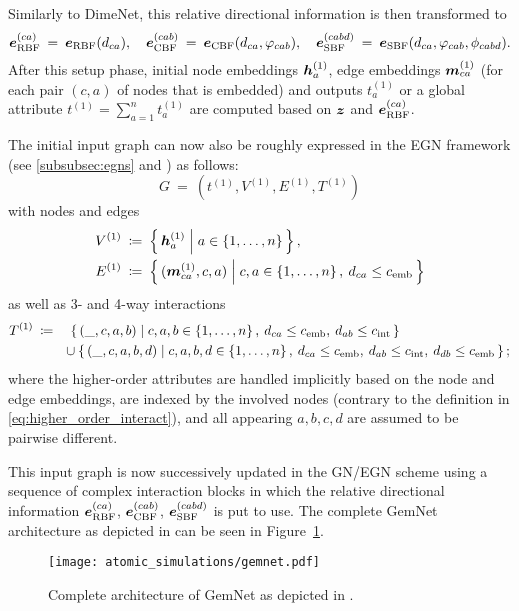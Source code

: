 Similarly to DimeNet, this relative directional information is then transformed to
\[
    \boldsymbol{e}_{\text{RBF}}^{(ca)} \: = \: \boldsymbol{e}_{\text{RBF}}(d_{ca}), 
    \quad \boldsymbol{e}_{\text{CBF}}^{(cab)} \: = \: \boldsymbol{e}_{\text{CBF}}(d_{ca}, \varphi_{cab}),
    \quad \boldsymbol{e}_{\text{SBF}}^{(cabd)} \: = \: \boldsymbol{e}_{\text{SBF}}(d_{ca}, \varphi_{cab}, \phi_{cabd}) 
    \text{.}
\]
After this setup phase, initial node embeddings $\boldsymbol{h}_{a}^{(1)}$, edge embeddings 
$\boldsymbol{m}_{ca}^{(1)}$ (for each pair $(c, a)$ of nodes that is embedded) and outputs
$t_{a}^{(1)}$ or a global attribute $t^{(1)} = \sum_{a=1}^n t_a^{(1)}$
are computed based on $\boldsymbol{z}$ and $\boldsymbol{e}_{\text{RBF}}^{(ca)}$. 

The initial input graph can now also be roughly expressed in the
EGN framework (see \ref{subsubsec:egns} and 
\cite{https://doi.org/10.48550/arxiv.2203.09697}) as follows:
\[
    G \: = \: (t^{(1)}, V^{(1)}, E^{(1)}, T^{(1)})
\]
with nodes and edges
\begin{align*}
    V^{(1)} \: &\coloneqq \: 
    \left\{\, \boldsymbol{h}_{a}^{(1)} \; \middle| \; a \in \left\{1, \dots, n\right\} \,\right\}, \\
    E^{(1)} \: &\coloneqq \: 
    \left\{\, (\boldsymbol{m}_{ca}^{(1)}, c, a) \; \middle| \; c, a \in \left\{1, \dots, n\right\}, \: d_{ca} \leq c_{\text{emb}} \,\right\}
\end{align*}
as well as 3- and 4-way interactions
\begin{align*}
    T^{(1)} \: &\coloneqq \quad 
    \left\{\, (\_, c, a, b) \; \middle| \; c, a, b \in \left\{1, \dots, n\right\}, 
    \: d_{ca} \leq c_{\text{emb}}, \: d_{ab} \leq c_{\text{int}} \,\right\} \\
    &\qquad \cup  \left\{\, (\_, c, a, b, d) \; \middle| \; c, a, b, d \in \left\{1, \dots, n\right\}, 
    \: d_{ca} \leq c_{\text{emb}}, \: d_{ab} \leq c_{\text{int}}, 
    \: d_{db} \leq c_{\text{emb}} \,\right\};
\end{align*}
where the higher-order attributes are handled implicitly 
based on the node and edge embeddings, are indexed by the involved nodes (contrary 
to the definition in \eqref{eq:higher_order_interact}), and all appearing $a, b, c, d$ 
are assumed to be pairwise different.

This input graph is now successively updated in the GN/EGN scheme using a sequence of 
complex interaction blocks in which the relative directional information 
$\boldsymbol{e}_{\text{RBF}}^{(ca)}$, $\boldsymbol{e}_{\text{CBF}}^{(cab)}$, $\boldsymbol{e}_{\text{SBF}}^{(cabd)}$ 
is put to use. The complete GemNet architecture as depicted in 
\cite{https://doi.org/10.48550/arxiv.2106.08903} can be seen in Figure~\ref{fig:gemnet}.

\begin{figure}[H]
    \centering
    \texttt{[image: atomic\_simulations/gemnet.pdf]}
    \caption{Complete architecture of GemNet as depicted in 
    \cite[Appendix F]{https://doi.org/10.48550/arxiv.2106.08903}.}
    \label{fig:gemnet}
\end{figure}
